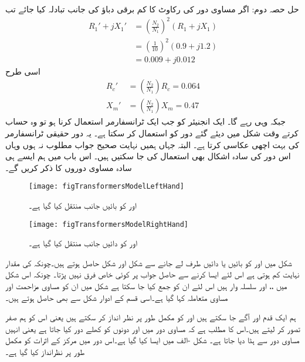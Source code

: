 	حل حصہ دوم:
اگر مساوی دور کی رکاوٹ کا کم برقی دباؤ کی جانب تبادلہ کیا جائے تب
\begin{align*}
R_1'+j X_1' &=\left(\frac{N_2}{N_1} \right)^2 \left(R_1+j X_1 \right)\\
&=\left(\frac{1}{10} \right)^2 \left(0.9+j1.2 \right)\\
&=0.009+j0.012
\end{align*}
اسی طرح
\begin{align*}
R_c'&=\left(\frac{N_2}{N_1} \right) R_c=0.064\\
X_m'&=\left(\frac{N_2}{N_1} \right) X_m=0.47
\end{align*}
جبکہ  وہی رہے گا۔
%
ایک انجنیئر کو جب ایک ٹرانسفارمر استعمال کرنا ہو تو وہ حساب کرتے وقت شکل   میں دیئے گئے دور کو استعمال کر سکتا ہے۔ یہ دور حقیقی ٹرانسفارمر کی بہت اچھی عکاسی کرتا ہے۔ البتہ جہاں ہمیں نہایت صحیح جواب مطلوب نہ ہوں وہاں اس دور کی سادہ اشکال بھی استعمال کی جا سکتیں ہیں۔ اس باب میں ہم ایسے ہی سادہ مساوی دوروں کا ذکر کریں گے۔
\begin{figure}
\centering
\texttt{[image: figTransformersModelLeftHand]}
\caption{ اور  کو بائیں جانب منتقل کیا گیا ہے۔}
\label{شکل_ٹرانسفارمر_بائیں_جانب}
\end{figure}
%
\begin{figure}
\centering
\texttt{[image: figTransformersModelRightHand]}
\caption{ اور  کو دائیں جانب منتقل کیا گیا ہے۔}
\label{شکل_ٹرانسفارمر_دائیں_جانب}
\end{figure}

شکل   میں  اور  کو بائیں یا دائیں طرف لے جانے سے  شکل    اور  شکل   حاصل ہوتے ہیں۔چونکہ  کی مقدار نہایت کم  ہوتی ہے اس لئے ایسا  کرنے سے حاصل جواب پر کوئی خاص فرق نہیں پڑتا۔ چونکہ اس شکل میں  ،،   اور  سلسلہ وار ہیں اس لئے ان کو جمع کیا جا سکتا ہے شکل میں ان کو مساوی مزاحمت   اور مساوی متعاملہ  کہا گیا ہے۔اسی قسم کے ادوار  شکل   سے بھی حاصل ہوتے  ہیں۔

ہم ایک قدم اور آگے جا سکتے ہیں اور  کو مکمل طور پر نظر انداز کر سکتے ہیں یعنی اس کو ہم صفر تصور کر لیتے ہیں۔اس کا مطلب ہے کہ مساوی دور میں  اور  دونوں کو کھلے دور کیا جاتا ہے  یعنی انہیں مساوی دور سے ہٹا دیا جاتا ہے۔ شکل -الف  میں ایسا کیا گیا ہے۔اس دور میں مرکز کے اثرات کو مکمل طور پر نظرانداز کیا گیا ہے۔

